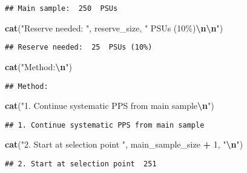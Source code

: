 \documentclass[
]{article}
\newenvironment{Shaded}{\begin{snugshade}}{\end{snugshade}}
\newcommand{\DecValTok}[1]{\textcolor[rgb]{0.00,0.00,0.81}{#1}}
\newcommand{\FunctionTok}[1]{\textcolor[rgb]{0.13,0.29,0.53}{\textbf{#1}}}
\newcommand{\NormalTok}[1]{#1}
\newcommand{\SpecialCharTok}[1]{\textcolor[rgb]{0.81,0.36,0.00}{\textbf{#1}}}
\newcommand{\StringTok}[1]{\textcolor[rgb]{0.31,0.60,0.02}{#1}}
\begin{document}
\begin{verbatim}
## Main sample:  250  PSUs
\end{verbatim}

\begin{Shaded}
\begin{Highlighting}[]
\FunctionTok{cat}\NormalTok{(}\StringTok{"Reserve needed: "}\NormalTok{, reserve\_size, }\StringTok{" PSUs (10\%)}\SpecialCharTok{\textbackslash{}n\textbackslash{}n}\StringTok{"}\NormalTok{)}
\end{Highlighting}
\end{Shaded}

\begin{verbatim}
## Reserve needed:  25  PSUs (10%)
\end{verbatim}

\begin{Shaded}
\begin{Highlighting}[]
\FunctionTok{cat}\NormalTok{(}\StringTok{"Method:}\SpecialCharTok{\textbackslash{}n}\StringTok{"}\NormalTok{)}
\end{Highlighting}
\end{Shaded}

\begin{verbatim}
## Method:
\end{verbatim}

\begin{Shaded}
\begin{Highlighting}[]
\FunctionTok{cat}\NormalTok{(}\StringTok{"1. Continue systematic PPS from main sample}\SpecialCharTok{\textbackslash{}n}\StringTok{"}\NormalTok{)}
\end{Highlighting}
\end{Shaded}

\begin{verbatim}
## 1. Continue systematic PPS from main sample
\end{verbatim}

\begin{Shaded}
\begin{Highlighting}[]
\FunctionTok{cat}\NormalTok{(}\StringTok{"2. Start at selection point "}\NormalTok{, main\_sample\_size }\SpecialCharTok{+} \DecValTok{1}\NormalTok{, }\StringTok{"}\SpecialCharTok{\textbackslash{}n}\StringTok{"}\NormalTok{)}
\end{Highlighting}
\end{Shaded}

\begin{verbatim}
## 2. Start at selection point  251
\end{verbatim}
\end{document}
